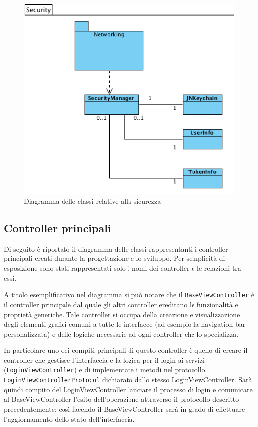 \begin{figure}[!htbp]
\centering
\includegraphics[scale=0.70]{architettura/securityClass.png}
\caption{Diagramma delle classi relative alla sicurezza}
\end{figure}

\subsection{Controller principali}
Di seguito è riportato il diagramma delle classi rappresentanti i controller principali creati durante la progettazione e lo sviluppo. Per semplicità di esposizione sono stati rappresentati solo i nomi dei controller e le relazioni tra essi.
\newline

A titolo esemplificativo nel diagramma si può notare che il \texttt{BaseViewController} è il controller principale dal quale gli altri controller ereditano le funzionalità e proprietà generiche. Tale controller si occupa della creazione e visualizzazione degli  elementi grafici comuni a tutte le interfacce (ad esempio la navigation bar personalizzata) e delle logiche necessarie ad ogni controller che lo specializza.

In particolare uno dei compiti principali di questo controller è quello di creare il controller che gestisce l'interfaccia e la logica per il login ai servizi (\texttt{LoginViewController}) e di implementare i metodi nel  protocollo \texttt{LoginViewControllerProtocol} dichiarato dallo stesso LoginViewController. Sarà quindi compito del LoginViewController  lanciare il processo di login e comunicare al BaseViewController l'esito dell'operazione attraverso il protocollo descritto precedentemente; così facendo il BaseViewController sarà in grado di effettuare l'aggiornamento dello stato dell'interfaccia.


